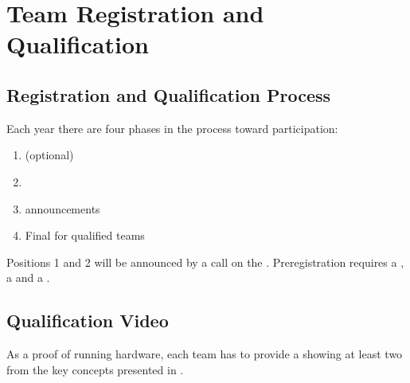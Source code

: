 \section{Team Registration and Qualification}


\subsection{Registration and Qualification Process}
\label{rule:participation}

Each year there are four phases in the process toward participation:
\begin{enumerate}
	\item {} (optional)
	\item {} 
	\item {} announcements
	\item Final  for qualified teams
\end{enumerate}
Positions 1 and 2 will be announced by a call on the . Preregistration requires a , a  and a .

\subsection{Qualification Video}
As a proof of running hardware, each team has to provide a  showing at least two from the key concepts presented in .




